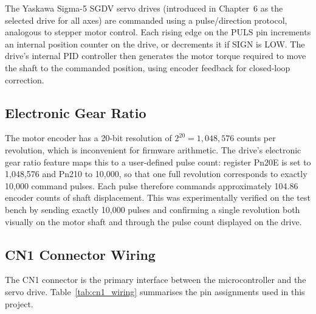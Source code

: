 The Yaskawa Sigma-5 SGDV servo drives (introduced in Chapter~6 as the selected drive for all axes) are commanded using a pulse/direction protocol, analogous to stepper motor control. Each rising edge on the PULS pin increments an internal position counter on the drive, or decrements it if SIGN is LOW. The drive's internal PID controller then generates the motor torque required to move the shaft to the commanded position, using encoder feedback for closed-loop correction.

\subsection{Electronic Gear Ratio}

The motor encoder has a 20-bit resolution of $2^{20} = 1{,}048{,}576$ counts per revolution, which is inconvenient for firmware arithmetic. The drive's electronic gear ratio feature maps this to a user-defined pulse count: register Pn20E is set to 1,048,576 and Pn210 to 10,000, so that one full revolution corresponds to exactly 10,000 command pulses. Each pulse therefore commands approximately 104.86 encoder counts of shaft displacement. This was experimentally verified on the test bench by sending exactly 10,000 pulses and confirming a single revolution both visually on the motor shaft and through the pulse count displayed on the drive.

\subsection{CN1 Connector Wiring}

The CN1 connector is the primary interface between the microcontroller and the servo drive. Table~\ref{tab:cn1_wiring} summarises the pin assignments used in this project.


